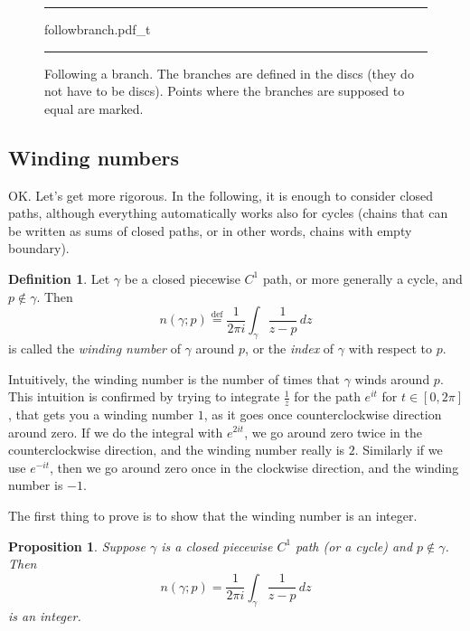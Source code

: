 \documentclass[12pt,openany]{book}
\newcommand{\myindex}[1]{#1\index{#1}}
\theoremstyle{plain}
\newtheorem{prop}[thm]{Proposition}
\theoremstyle{remark}
\theoremstyle{definition}
\newtheorem{defn}[thm]{Definition}
\newenvironment{myfig}{%
\begin{figure}[h!t]
\noindent\rule{\textwidth}{0.4pt}\vspace{12pt}\par\centering}%
{\par\noindent\rule{\textwidth}{0.4pt}
\end{figure}}
\theoremstyle{exercise}
\theoremstyle{example}
\begin{document}
\begin{myfig}
{followbranch.pdf_t}
\caption{Following a branch.
The branches are defined in the discs
(they do not have to be discs).
Points where the branches are supposed to equal
are marked.\label{fig:followbranch}}
\end{myfig}

\subsection{Winding numbers}

OK.  Let's get more rigorous.  In the following, it is enough
to consider closed paths, although everything automatically works
also for cycles (chains that can be written as sums of closed paths,
or in other words, chains with empty boundary).

\begin{defn}
Let $\gamma$ be a closed piecewise $C^1$ path, or more generally a cycle,
and $p \notin \gamma$.  Then
\begin{equation*}
n(\gamma;p)
\overset{\text{def}}{=}
\frac{1}{2\pi i} \int_\gamma \frac{1}{z-p} \, dz
\end{equation*}
is called the
\emph{\myindex{winding number}} of $\gamma$ around $p$, or
the 
\emph{\myindex{index}} of $\gamma$ with respect to $p$.
\end{defn}

Intuitively, the winding number is the number of times that $\gamma$ winds
around $p$.  This intuition is confirmed by trying to integrate
$\frac{1}{z}$ for the path $e^{it}$ for $t \in [0,2\pi]$, that gets you 
a winding number $1$, as it goes once counterclockwise direction around zero.  If we do
the integral with $e^{2it}$, we go around zero twice in the
counterclockwise direction, and the winding number really is $2$.  Similarly
if we use $e^{-it}$, then we go around zero once in the
clockwise direction, and the winding number is $-1$.

The first thing to prove is to show that the winding number is an integer.

\begin{prop}
Suppose $\gamma$ is a closed piecewise $C^1$ path (or a cycle)
and $p \notin \gamma$.  Then
\begin{equation*}
n(\gamma;p) = \frac{1}{2\pi i} \int_\gamma \frac{1}{z-p} \, dz
\end{equation*}
is an integer.
\end{prop}
\end{document}
